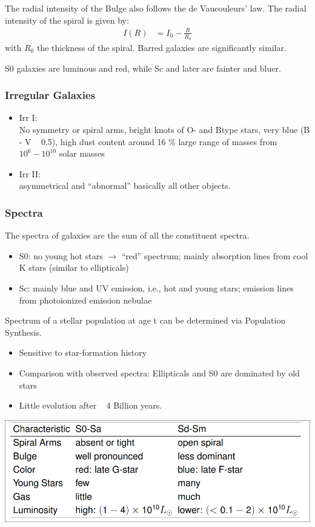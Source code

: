 \documentclass[11pt,a4paper]{article}
\begin{document}
The radial intensity of the Bulge also follows the de Vaucouleurs' law. 
The radial intensity of the spiral is given by: 
\begin{align*}
    I(R) &= I_0 - \frac {R}{R_0} 
\end{align*}
with $R_0$ the thickness of the spiral. 
Barred galaxies are significantly similar.

S0 galaxies are luminous and red, while Sc and later are fainter and bluer.

\subsubsection{Irregular Galaxies}
\begin{itemize}
    \item Irr I: \\ 
        No symmetry or spiral arms, bright knots of O- and Btype stars, very blue (B - V ~ 0.5), high dust content around 16 \% large range of masses from $10^6-10^{10}$ solar masses
    \item Irr II: \\
        asymmetrical and “abnormal” basically all other objects. 
\end{itemize}
\subsubsection{Spectra}
The spectra of galaxies are the sum of all the constituent spectra.
\begin{itemize}
    \item S0: no young hot stars $\rightarrow$ “red”
spectrum; mainly absorption
lines from cool K stars (similar to
ellipticals) 
\item Sc: mainly blue and UV emission, i.e., hot and young stars;
emission lines from photoionized
emission nebulae
\end{itemize}
Spectrum of a stellar population at
age t can be determined via Population Synthesis.
\begin{itemize}
    \item Sensitive to star-formation history
    \item Comparison with observed spectra:
Ellipticals and S0 are dominated by
old stars
\item Little evolution after ~ 4 Billion
years.
\end{itemize}
\begin{center}
    \includegraphics[width=0.8\linewidth]{screenshot_2024-01-24-123415.png}
\end{center}
\end{document}
